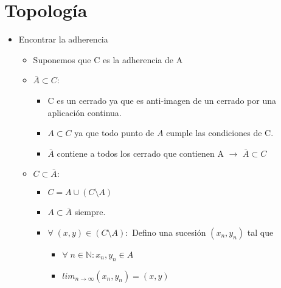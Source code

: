 \documentclass[twoside]{article}
\newcommand{\all}{\forall \;}
\begin{document}
\setlength{\baselineskip}{1.5\baselineskip}
\renewcommand{\labelitemi}{$\bullet$}
\renewcommand{\labelitemii}{$\cdot$}

\section{Topología}

\begin{itemize}

\item Encontrar la adherencia

\begin{itemize}

\item Suponemos que C es la adherencia de A

\item $\bar{A} \subset C$:

\begin{itemize}

\item C es un cerrado ya que es anti-imagen de un cerrado por una aplicación continua.

\item $A \subset C$ ya que todo punto de $A$ cumple las condiciones de C.

\item $\bar{A}$ contiene a todos los cerrado que contienen A $\rightarrow$ $\bar{A} \subset C$

\end{itemize}

\item $C \subset \bar{A}:$

\begin{itemize}

\item $C = A \cup (C \setminus A)$

\item $A \subset \bar{A}$ siempre.

\item $\all (x,y) \in (C \setminus A):$ Defino una sucesión $(x_n,y_n)$ tal que 

\begin{itemize}

\item $\all n \in \mathbb{N}: x_n, y_n \in A$

\item $lim_{n \rightarrow \infty} (x_n,y_n) = (x,y)$
\end{itemize}


\end{itemize}
\end{itemize}
\end{itemize}
\end{document}
